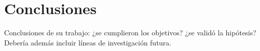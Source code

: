 \chapter{Conclusiones} %
\label{sec:conclusiones} %

Conclusiones de su trabajo: ¿se cumplieron los objetivos? ¿se validó la hipótesis? Debería además incluir líneas de investigación futura.